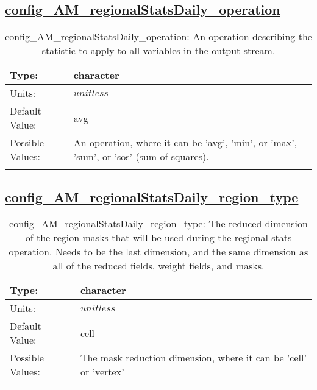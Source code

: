 \subsection[config\_AM\_regionalStatsDaily\_operation]{\hyperref[sec:nm_tab_AM_regionalStatsDaily]{config\_AM\_regionalStatsDaily\_operation}}
\label{subsec:nm_sec_config_AM_regionalStatsDaily_operation}
\begin{center}
\begin{longtable}{| p{2.0in} || p{4.0in} |}
    \hline
    Type: & character \\
    \hline
    Units: & $unitless$ \\
    \hline
    Default Value: & avg \\
    \hline
    Possible Values: & An operation, where it can be 'avg', 'min', or 'max', 'sum', or 'sos' (sum of squares). \\
    \hline
    \caption{config\_AM\_regionalStatsDaily\_operation: An operation describing the statistic to apply to all variables in the output stream.}
\end{longtable}
\end{center}
\subsection[config\_AM\_regionalStatsDaily\_region\_type]{\hyperref[sec:nm_tab_AM_regionalStatsDaily]{config\_AM\_regionalStatsDaily\_region\_type}}
\label{subsec:nm_sec_config_AM_regionalStatsDaily_region_type}
\begin{center}
\begin{longtable}{| p{2.0in} || p{4.0in} |}
    \hline
    Type: & character \\
    \hline
    Units: & $unitless$ \\
    \hline
    Default Value: & cell \\
    \hline
    Possible Values: & The mask reduction dimension, where it can be 'cell' or 'vertex' \\
    \hline
    \caption{config\_AM\_regionalStatsDaily\_region\_type: The reduced dimension of the region masks that will be used during the regional stats operation. Needs to be the last dimension, and the same dimension as all of the reduced fields, weight fields, and masks.}
\end{longtable}
\end{center}
